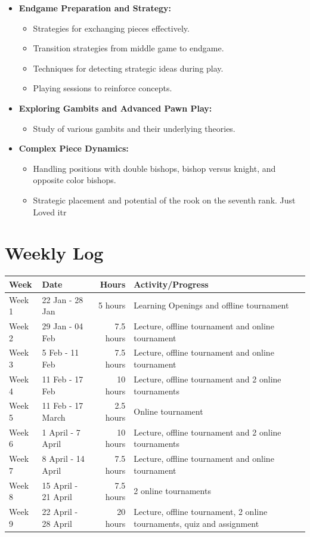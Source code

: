 \documentclass[a4paper,11pt]{article}
\begin{document}
\begin{itemize}
    \item \textbf{Endgame Preparation and Strategy:}
    \begin{itemize}
        \item Strategies for exchanging pieces effectively.
        \item Transition strategies from middle game to endgame.
        \item Techniques for detecting strategic ideas during play.
        \item Playing sessions to reinforce concepts.
    \end{itemize}

    \item \textbf{Exploring Gambits and Advanced Pawn Play:}
    \begin{itemize}
        \item Study of various gambits and their underlying theories.
    \end{itemize}

    \item \textbf{Complex Piece Dynamics:}
    \begin{itemize}
        \item Handling positions with double bishops, bishop versus knight, and opposite color bishops.
        \item Strategic placement and potential of the rook on the seventh rank. Just Loved itr 
    \end{itemize}
\end{itemize}


\section*{Weekly Log}

\noindent
\begin{tabularx}{\textwidth}{lXrX}
\toprule
\textbf{Week} & \textbf{Date} & \textbf{Hours} & \textbf{Activity/Progress} \\
\midrule
Week 1 & 22 Jan - 28 Jan & 5 hours & Learning Openings and offline tournament \\
Week 2 & 29 Jan - 04 Feb & 7.5 hours & Lecture, offline tournament and online tournament \\
Week 3 & 5 Feb - 11 Feb & 7.5 hours & Lecture, offline tournament and online tournament \\
Week 4 & 11 Feb - 17 Feb & 10 hours & Lecture, offline tournament and 2 online tournaments \\
Week 5 & 11 Feb - 17 March & 2.5 hours & Online tournament \\
Week 6 & 1 April - 7 April & 10 hours & Lecture, offline tournament and 2 online tournaments \\
Week 7 & 8 April - 14 April & 7.5 hours & Lecture, offline tournament and online tournament \\
Week 8 & 15 April - 21 April & 7.5 hours & 2 online tournaments \\
Week 9 & 22 April - 28 April & 20 hours & Lecture, offline tournament, 2 online tournaments, quiz and assignment \\
\bottomrule
\end{tabularx}
\end{document}
